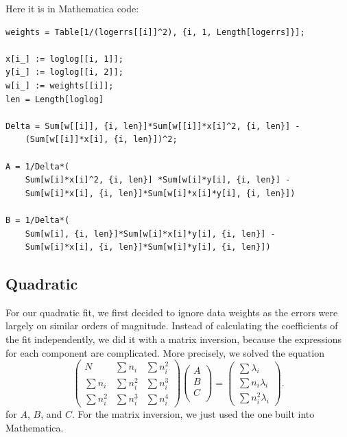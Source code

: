 \documentclass[12pt,twoside]{reedthesis}
\newcommand{\eqn}[1]{\begin{equation}#1\end{equation}}
\begin{document}
Here it is in Mathematica code:
\begin{Verbatim}
weights = Table[1/(logerrs[[i]]^2), {i, 1, Length[logerrs]}];

x[i_] := loglog[[i, 1]];
y[i_] := loglog[[i, 2]];
w[i_] := weights[[i]]; 
len = Length[loglog]

Delta = Sum[w[[i]], {i, len}]*Sum[w[[i]]*x[i]^2, {i, len}] -
	(Sum[w[[i]]*x[i], {i, len}])^2;

A = 1/Delta*(
	Sum[w[i]*x[i]^2, {i, len}] *Sum[w[i]*y[i], {i, len}] - 
	Sum[w[i]*x[i], {i, len}]*Sum[w[i]*x[i]*y[i], {i, len}])
	
B = 1/Delta*(
	Sum[w[i], {i, len}]*Sum[w[i]*x[i]*y[i], {i, len}] - 
	Sum[w[i]*x[i], {i, len}]*Sum[w[i]*y[i], {i, len}])
\end{Verbatim}

\subsection{Quadratic}
For our quadratic fit, we first decided to ignore data weights as the errors were largely on similar orders of magnitude.  Instead of calculating the coefficients of the fit independently, we did it with a matrix inversion, because the expressions for each component are complicated. More precisely, we solved the equation
\eqn{
\left(
\begin{array}{ccc}
N & \sum n_i &  \sum n_i^2 \\
\sum n_i & \sum n_i ^2 & \sum n_i^3 \\
\sum n_i ^2 & \sum n_i^3 & \sum n_i ^4
\end{array}
\right)
\left(
\begin{array}{c}
A \\
B \\
C \\
\end{array}
\right)
=
\left(
\begin{array}{c}
\sum \lambda_i \\
\sum n_i \lambda_i \\
\sum n_i^2 \lambda_i
\end{array}
\right)
\mbox{.}
}
for $A$, $B$, and $C$. For the matrix inversion, we just used the one built into Mathematica. 
\end{document}
